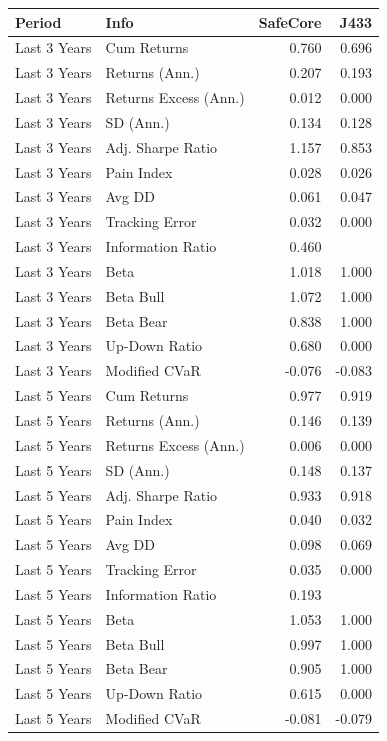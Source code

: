\documentclass[11pt,preprint, authoryear]{elsarticle}
\let\origtable\table
\let\endorigtable\endtable
\renewenvironment{table}[1][2] {
    \expandafter\origtable\expandafter[H]
} {
    \endorigtable
}
\numberwithin{equation}{section}
\numberwithin{figure}{section}
\numberwithin{table}{section}
\begin{document}
\begin{table}[H]
\centering
\begin{tabular}{llrr}
  \hline
Period & Info & SafeCore & J433 \\ 
  \hline
Last 3 Years & Cum Returns & 0.760 & 0.696 \\ 
  Last 3 Years & Returns (Ann.) & 0.207 & 0.193 \\ 
  Last 3 Years & Returns Excess (Ann.) & 0.012 & 0.000 \\ 
  Last 3 Years & SD (Ann.) & 0.134 & 0.128 \\ 
  Last 3 Years & Adj. Sharpe Ratio & 1.157 & 0.853 \\ 
  Last 3 Years & Pain Index & 0.028 & 0.026 \\ 
  Last 3 Years & Avg DD & 0.061 & 0.047 \\ 
  Last 3 Years & Tracking Error & 0.032 & 0.000 \\ 
  Last 3 Years & Information Ratio & 0.460 &  \\ 
  Last 3 Years & Beta & 1.018 & 1.000 \\ 
  Last 3 Years & Beta Bull & 1.072 & 1.000 \\ 
  Last 3 Years & Beta Bear & 0.838 & 1.000 \\ 
  Last 3 Years & Up-Down Ratio & 0.680 & 0.000 \\ 
  Last 3 Years & Modified CVaR & -0.076 & -0.083 \\ 
  Last 5 Years & Cum Returns & 0.977 & 0.919 \\ 
  Last 5 Years & Returns (Ann.) & 0.146 & 0.139 \\ 
  Last 5 Years & Returns Excess (Ann.) & 0.006 & 0.000 \\ 
  Last 5 Years & SD (Ann.) & 0.148 & 0.137 \\ 
  Last 5 Years & Adj. Sharpe Ratio & 0.933 & 0.918 \\ 
  Last 5 Years & Pain Index & 0.040 & 0.032 \\ 
  Last 5 Years & Avg DD & 0.098 & 0.069 \\ 
  Last 5 Years & Tracking Error & 0.035 & 0.000 \\ 
  Last 5 Years & Information Ratio & 0.193 &  \\ 
  Last 5 Years & Beta & 1.053 & 1.000 \\ 
  Last 5 Years & Beta Bull & 0.997 & 1.000 \\ 
  Last 5 Years & Beta Bear & 0.905 & 1.000 \\ 
  Last 5 Years & Up-Down Ratio & 0.615 & 0.000 \\ 
  Last 5 Years & Modified CVaR & -0.081 & -0.079 \\ 
   \hline
\end{tabular}
\caption{SafeCore statistics relative to the Capped SWIX \label{Table_Stats}} 
\end{table}
\end{document}
